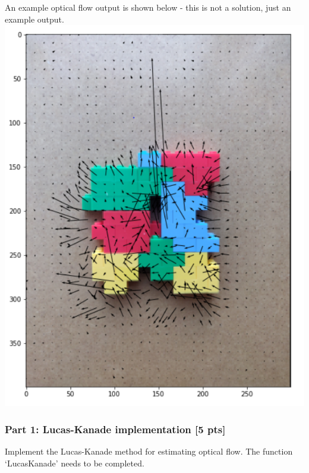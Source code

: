 \documentclass[11pt]{article}
\makeatletter
\def\maxwidth{\ifdim\Gin@nat@width>\linewidth\linewidth
    \else\Gin@nat@width\fi}
\let\Oldincludegraphics\includegraphics
\renewcommand{\includegraphics}[1]{\Oldincludegraphics[width=.8\maxwidth]{#1}}
\makeatother
\begin{document}
An example optical flow output is shown below - this is not a solution,
just an example output.
\includegraphics{optical_flow_images/sample_optical_flow_output.PNG}

    \hypertarget{part-1-lucas-kanade-implementation-5-pts}{%
\subsubsection{Part 1: Lucas-Kanade implementation {[}5
pts{]}}\label{part-1-lucas-kanade-implementation-5-pts}}

Implement the Lucas-Kanade method for estimating optical flow. The
function `LucasKanade' needs to be completed.
\end{document}
